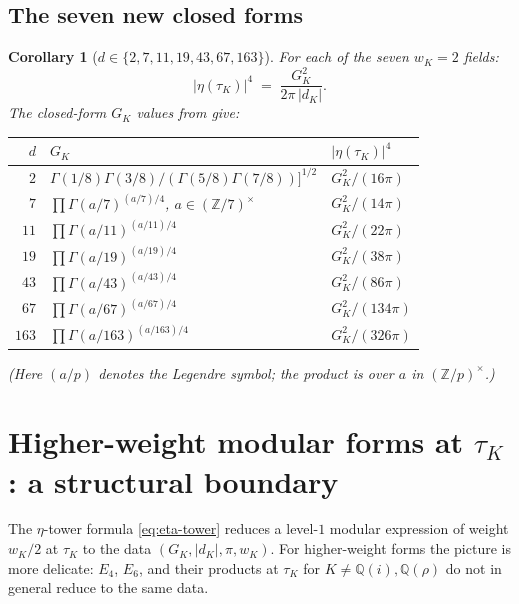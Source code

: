 \documentclass[11pt]{amsart}
\theoremstyle{plain}
\newtheorem{corollary}[theorem]{Corollary}
\theoremstyle{definition}
\theoremstyle{remark}
\newcommand{\GK}{G_{K}}
\newcommand{\Z}{\mathbb{Z}}
\newcommand{\Q}{\mathbb{Q}}
\begin{document}
\subsection{The seven new closed forms}

\begin{corollary}[$d \in \{2, 7, 11, 19, 43, 67, 163\}$]\label{cor:eta-new}
For each of the seven $w_K = 2$ fields:
\[
|\eta(\tau_K)|^{4} \;=\; \frac{\GK^{2}}{2\pi\,|d_K|}.
\]
The closed-form $\GK$ values from \cite[Theorem 1.3]{paper-gstar-C} give:
\begin{center}
\begin{tabular}{rll}
\toprule
$d$ & $\GK$ & $|\eta(\tau_K)|^{4}$ \\
\midrule
$2$   & $\Gamma(1/8)\Gamma(3/8)/(\Gamma(5/8)\Gamma(7/8))]^{1/2}$ & $\GK^{2}/(16\pi)$ \\
$7$   & $\prod\Gamma(a/7)^{(a/7)/4}$, $a \in (\Z/7)^\times$       & $\GK^{2}/(14\pi)$ \\
$11$  & $\prod\Gamma(a/11)^{(a/11)/4}$                            & $\GK^{2}/(22\pi)$ \\
$19$  & $\prod\Gamma(a/19)^{(a/19)/4}$                            & $\GK^{2}/(38\pi)$ \\
$43$  & $\prod\Gamma(a/43)^{(a/43)/4}$                            & $\GK^{2}/(86\pi)$ \\
$67$  & $\prod\Gamma(a/67)^{(a/67)/4}$                            & $\GK^{2}/(134\pi)$ \\
$163$ & $\prod\Gamma(a/163)^{(a/163)/4}$                          & $\GK^{2}/(326\pi)$ \\
\bottomrule
\end{tabular}
\end{center}
(Here $(a/p)$ denotes the Legendre symbol; the product is over $a$ in
$(\Z/p)^{\times}$.)
\end{corollary}

\section{Higher-weight modular forms at $\tau_K$: a structural boundary}\label{sec:higher-weight}

The $\eta$-tower formula \eqref{eq:eta-tower} reduces a level-$1$ modular
expression of weight $w_K/2$ at $\tau_K$ to the data $(\GK, |d_K|, \pi, w_K)$.
For higher-weight forms the picture is more delicate: $E_4$, $E_6$, and
their products at $\tau_K$ for $K \neq \Q(i), \Q(\rho)$ do not in general
reduce to the same data.
\end{document}
